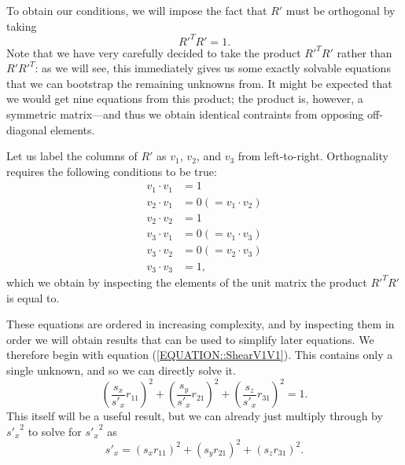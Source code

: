 \documentclass{article}
\begin{document}
To obtain our conditions, we will impose the fact that $R'$ must be orthogonal by taking
\begin{equation}
R'^T R' = 1.
\end{equation}
Note that we have very carefully decided to take the product $R'^T R'$ rather than $R' R'^T$: as we will see, this immediately gives us some exactly solvable equations that we can bootstrap the remaining unknowns from. It might be expected that we would get nine equations from this product; the product is, however, a symmetric matrix---and thus we obtain identical contraints from opposing off-diagonal elements.

Let us label the columns of $R'$ as $v_1$, $v_2$, and $v_3$ from left-to-right. Orthognality requires the following conditions to be true:
\begin{align}
\label{EQUATION::ShearV1V1} v_1 \cdot v_1 &= 1\\
\label{EQUATION::ShearV2V1} v_2 \cdot v_1 &= 0 (= v_1 \cdot v_2)\\
\label{EQUATION::ShearV2V2} v_2 \cdot v_2 &= 1\\
\label{EQUATION::ShearV3V1} v_3 \cdot v_1 &= 0(= v_1 \cdot v_3)\\
\label{EQUATION::ShearV3V2} v_3 \cdot v_2 &= 0(= v_2 \cdot v_3)\\
\label{EQUATION::ShearV3V3} v_3 \cdot v_3 &= 1,
\end{align}
which we obtain by inspecting the elements of the unit matrix the product $R'^T R'$ is equal to.

These equations are ordered in increasing complexity, and by inspecting them in order we will obtain results that can be used to simplify later equations. We therefore begin with equation (\ref{EQUATION::ShearV1V1}). This contains only a single unknown, and so we can directly solve it.
\begin{equation}
\label{EQUATION::ShearV1V1Expanded} 
\left(\frac{s_x}{s'_x} r_{11}\right)^2 + \left(\frac{s_y}{s'_x} r_{21}\right)^2 +\left(\frac{s_z}{s'_x} r_{31}\right)^2  = 1.
\end{equation}
This itself will be a useful result, but we can already just multiply through by ${s'_x}^2$ to solve for ${s'_x}^2$ as
\begin{equation}
s'_x = \left(s_x r_{11}\right)^2 + \left(s_y r_{21}\right)^2 +\left(s_z r_{31}\right)^2.
\end{equation}
\end{document}
